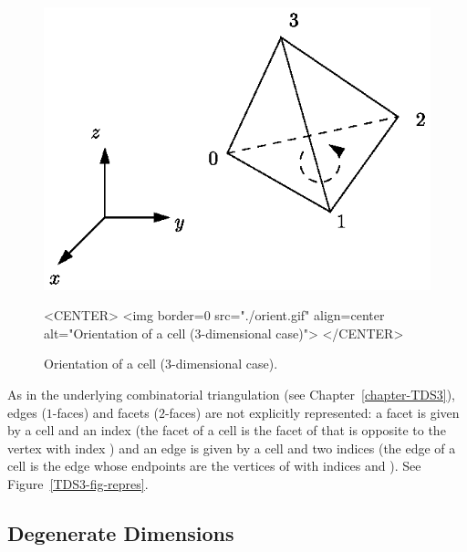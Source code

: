 \begin{figure}[htbp]
\begin{ccTexOnly}
\begin{center} 
\includegraphics{orient.eps} 
\end{center}
\end{ccTexOnly}
\caption{Orientation of a cell (3-dimensional case).
\label{Triangulation3-fig-orient}}
\begin{ccHtmlOnly}
<CENTER>
<img border=0 src="./orient.gif" align=center alt="Orientation of a cell 
(3-dimensional case)">
</CENTER>
\end{ccHtmlOnly}
\end{figure} 

As in the underlying combinatorial triangulation (see
Chapter~\ref{chapter-TDS3}), edges ($1$-faces) and facets ($2$-faces)
are not explicitly 
represented: a facet is given by a cell and an index (the facet
 of a cell  is the facet of  that is opposite to
the vertex with index ) and an edge is given by a cell and two
indices (the edge  of a cell  is the edge whose
endpoints are the vertices of  with indices  and
). See Figure~\ref{TDS3-fig-repres}.  

\subsection{Degenerate Dimensions}
\label{Triangulation3-sec-degen_dim}

